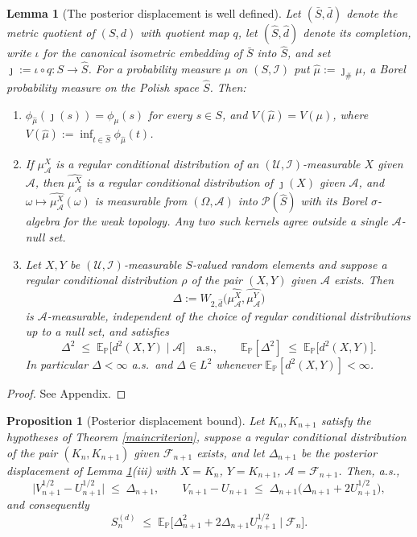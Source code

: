 \documentclass{article}
\newcommand{\E}{\mathbb{E}_{\mathbb{P}}}
\newcommand{\F}{\mathcal{F}}
\newcommand{\I}{\mathcal{I}}
\newcommand{\1}{\mathbbm{1}}
\newtheorem{prop}{Proposition}
\newtheorem{lemma}{Lemma}
\begin{document}
\begin{lemma}[The posterior displacement is well defined]
\label{displacement}
Let $(\bar S,\bar d)$ denote the metric quotient of $(S,d)$ with quotient map $q$, let
$(\hat S,\hat d)$ denote its completion, write $\iota$ for the canonical isometric embedding of
$\bar S$ into $\hat S$, and set $\jmath:=\iota\circ q:S\to\hat S$. For a probability measure $\mu$
on $(S,\I)$ put $\hat\mu:=\jmath_{\#}\mu$, a Borel probability measure on the Polish space $\hat S$.
Then:
\begin{enumerate}
\item[(i)] $\phi_{\hat\mu}(\jmath(s))=\phi_\mu(s)$ for every $s\in S$, and $V(\hat\mu)=V(\mu)$,
where $V(\hat\mu):=\inf_{t\in\hat S}\phi_{\hat\mu}(t)$.
\item[(ii)] If $\mu^X_\mathcal{A}$ is a regular conditional distribution of an
$(\mathcal U,\I)$-measurable $X$ given $\mathcal{A}$, then
$\widehat{\mu^X_\mathcal{A}}$ is a regular conditional distribution of $\jmath(X)$ given
$\mathcal{A}$, and $\omega\mapsto\widehat{\mu^X_\mathcal{A}}(\omega)$ is measurable from
$(\Omega,\mathcal{A})$ into $\mathcal{P}(\hat S)$ with its Borel $\sigma$-algebra for the weak
topology. Any two such kernels agree outside a single $\mathcal{A}$-null set.
\item[(iii)] Let $X,Y$ be $(\mathcal U,\I)$-measurable $S$-valued random elements and suppose a
regular conditional distribution $\rho$ of the pair $(X,Y)$ given $\mathcal{A}$ exists. Then
\[
\Delta:=W_{2,\hat d}\big(\widehat{\mu^X_\mathcal{A}},\widehat{\mu^Y_\mathcal{A}}\big)
\]
is $\mathcal{A}$-measurable, independent of the choice of regular conditional distributions up to a
null set, and satisfies
\[
\Delta^2\;\le\;\E\big[d^2(X,Y)\mid\mathcal{A}\big]\quad\text{a.s.},
\qquad
\E[\Delta^2]\;\le\;\E\big[d^2(X,Y)\big].
\]
In particular $\Delta<\infty$ a.s.\ and $\Delta\in L^2$ whenever $\E[d^2(X,Y)]<\infty$.
\end{enumerate}
\end{lemma}

\begin{proof}
See Appendix.
\end{proof}

\begin{prop}[Posterior displacement bound]
\label{dispbound}
Let $K_n,K_{n+1}$ satisfy the hypotheses of Theorem \ref{maincriterion}, suppose a regular
conditional distribution of the pair $(K_n,K_{n+1})$ given $\F_{n+1}$ exists, and let
$\Delta_{n+1}$ be the posterior displacement of Lemma \ref{displacement}(iii) with
$X=K_n$, $Y=K_{n+1}$, $\mathcal{A}=\F_{n+1}$. Then, a.s.,
\[
\big|V_{n+1}^{1/2}-U_{n+1}^{1/2}\big|\;\le\;\Delta_{n+1},
\qquad
V_{n+1}-U_{n+1}\;\le\;\Delta_{n+1}\big(\Delta_{n+1}+2U_{n+1}^{1/2}\big),
\]
and consequently
\[
S_n^{(d)}\;\le\;\E\big[\Delta_{n+1}^2+2\Delta_{n+1}U_{n+1}^{1/2}\;\big|\;\F_n\big].
\]
\end{prop}
\end{document}
